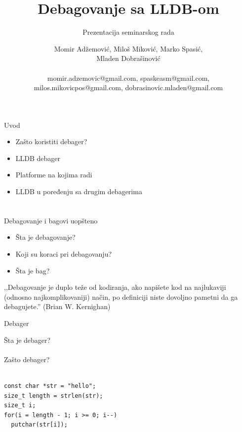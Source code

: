 \documentclass[bookmarks=true,bookmarksopen=true,pdfborder={0 0 0},pdfhighlight={/N},linkbordercolor={.5 .5 .5},implicit=false,unicode,xcolor={table}]{beamer}
\begin{document}
\title{Debagovanje sa LLDB-om}
\author{Momir Adžemović, Miloš Miković, Marko Spasić,\\ Mladen Dobrašinović\\~\\\small momir.adzemovic@gmail.com, spaskeasm@gmail.com,\\ \small milos.mikovicpos@gmail.com, dobrasinovic.mladen@gmail.com}
\subtitle{Prezentacija seminarskog rada}
\date{}


\begin{frame}
  
  \titlepage{}
  
\end{frame}

\begin{frame}{Uvod}
  
  \begin{itemize}
  	\item Zašto koristiti debager?
  	\item LLDB debager
  	\item Platforme na kojima radi
  	\item LLDB u poređenju sa drugim debagerima
  \end{itemize}

\end{frame}

\section{}
\begin{frame}{Debagovanje i bagovi uopšteno}
  \begin{itemize}
  \item Šta je debagovanje?
  \item Koji su koraci pri debagovanju?
  \item Šta je bag?
  \end{itemize}
  ,,Debagovanje je duplo teže od kodiranja, ako napišete kod na najlukaviji (odnosno najkomplikovaniji) način, po definiciji niste dovoljno pametni da ga debagujete.'' (Brian W. Kernighan)
\end{frame}

\begin{frame}[fragile]{Debager}

  Šta je debager?\\~\\

  Zašto debager?\\~\\
  
    \begin{lstlisting}
const char *str = "hello";
size_t length = strlen(str);
size_t i;
for(i = length - 1; i >= 0; i--)
  putchar(str[i]);\end{lstlisting}
\end{frame}
\end{document}
